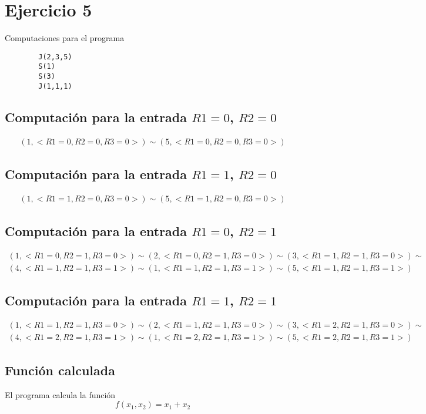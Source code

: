 \section{Ejercicio 5}
  		Computaciones para el programa
  		\begin{verbatim}
		J(2,3,5)
		S(1)
		S(3)
		J(1,1,1)
  		\end{verbatim}
  		\subsection{Computación para la entrada $R1=0$, $R2=0$}
  		\begin{equation*}\begin{gathered}
		(1, <R1=0, R2=0, R3=0>) \sim (5, <R1=0, R2=0, R3=0>)
		\end{gathered}\end{equation*}
		\subsection{Computación para la entrada $R1=1$, $R2=0$}
		\begin{equation*}\begin{gathered}
		(1, <R1=1, R2=0, R3=0>) \sim (5, <R1=1, R2=0, R3=0>)
		\end{gathered}\end{equation*}
		\subsection{Computación para la entrada $R1=0$, $R2=1$}
		\begin{equation*}\begin{gathered}
		(1, <R1=0, R2=1, R3=0>) \sim (2, <R1=0, R2=1, R3=0>) \sim (3, <R1=1, R2=1, R3=0>) \sim\\
		(4, <R1=1, R2=1, R3=1>) \sim (1, <R1=1, R2=1, R3=1>) \sim (5, <R1=1, R2=1, R3=1>)
		\end{gathered}\end{equation*}
		\subsection{Computación para la entrada $R1=1$, $R2=1$}
		\begin{equation*}\begin{gathered}
		(1, <R1=1, R2=1, R3=0>) \sim (2, <R1=1, R2=1, R3=0>) \sim (3, <R1=2, R2=1, R3=0>) \sim\\
		(4, <R1=2, R2=1, R3=1>) \sim (1, <R1=2, R2=1, R3=1>) \sim (5, <R1=2, R2=1, R3=1>)
		\end{gathered}\end{equation*}
		\subsection{Función calculada}
		El programa calcula la función
		\begin{equation*}
  			f(x_1, x_2) = x_1+x_2
  		\end{equation*}
